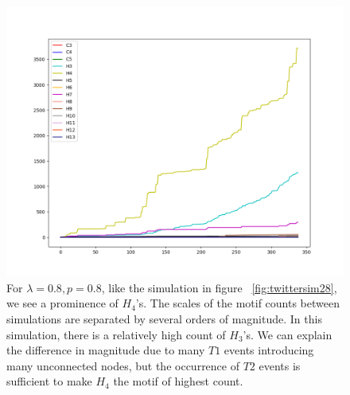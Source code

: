 \begin{figure}[h!]
    \includegraphics[width=\linewidth]{Images/twitter_sim_for_stats_3_0.8_0.8.png}
    \centering
    \caption{For $\lambda=0.8, p=0.8$, like the simulation in figure ~\ref{fig:twittersim28}, we see a prominence of $H_{4}$'s.
     The scales of the motif counts between simulations are separated by several orders of magnitude. In this simulation,
    there is a relatively high count of $H_{3}$'s. We can explain the difference in magnitude
     due to many $T1$ events introducing many unconnected nodes, but the occurrence of $T2$ events 
     is sufficient to make $H_{4}$ the motif of highest count.}
     \label{fig:thij0808}
\end{figure}

